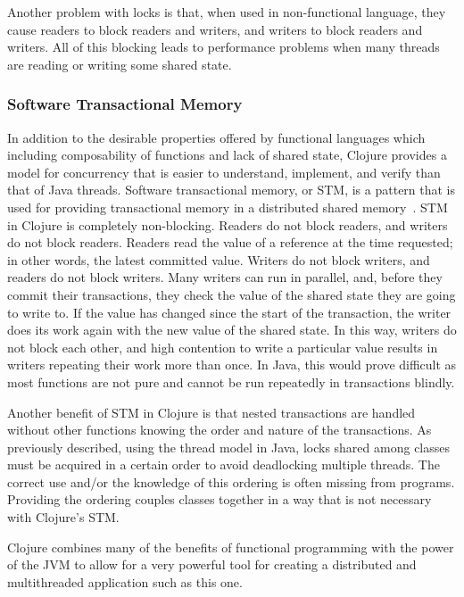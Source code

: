 Another problem with locks is that, when used in non-functional language, they cause 
readers to block readers and writers, and writers to block readers and
writers. 
All of this blocking leads to performance problems when many threads
are reading or writing some shared state.


\subsubsection{Software Transactional Memory}
In addition to the desirable properties offered by functional languages which including composability of functions and lack of shared state, Clojure provides a model for concurrency that is easier to understand, implement, and verify than that of Java threads.
Software transactional memory, or STM, is a pattern that is used for
providing transactional memory in a distributed shared
memory~\cite{stm}. 
STM in Clojure is completely non-blocking. 
Readers do not block readers, and writers do not block readers. 
Readers read the value of a reference at the time requested; in other
words, the latest committed value. 
Writers do not block writers, and readers do not block writers. 
Many writers can run in parallel, and, before they commit their
transactions, they check the value of the shared state they
are going to write to. 
If the value has changed since the start of the transaction, the
writer does its work again with the new value of the shared state. 
In this way, writers do not block each other, and high contention to
write a particular value results in writers repeating their work more
than once. 
In Java, this would prove difficult as most functions are not pure and cannot be run repeatedly in transactions blindly. 

Another benefit of STM in Clojure is that nested transactions are
handled without other functions knowing the order and nature of the
transactions. 
As previously described, using the thread model in Java, locks shared
among classes must be acquired in a certain order to avoid deadlocking
multiple threads. 
The correct use and/or the knowledge of this ordering is often missing
from programs. 
Providing the ordering couples classes together in a way that is not necessary with Clojure's STM.  

Clojure combines many of the benefits of functional programming with the power of the JVM to allow for a very powerful tool for creating a distributed and multithreaded application such as this one.  





